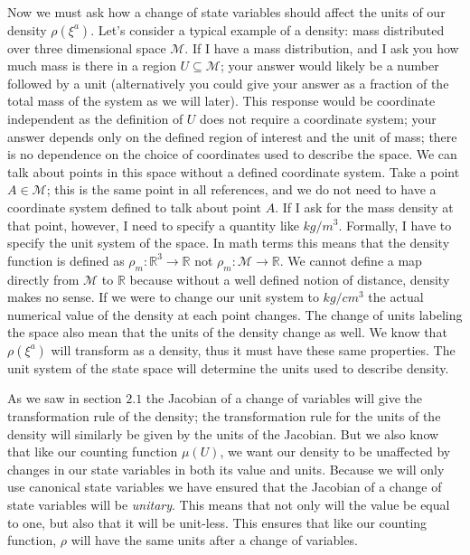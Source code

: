 \documentclass{article}
\begin{document}
	Now we must ask how a change of state variables should affect the units of our density $\rho(\xi^a)$. Let's consider a typical example of a density: mass distributed over three dimensional space $\mathcal{M}$. If I have a mass distribution, and I ask you how much mass is there in a region $U \subseteq \mathcal{M}$; your answer would likely be a number followed by a unit (alternatively you could give your answer as a fraction of the total mass of the system as we will later). This response would be coordinate independent as the definition of $U$ does not require a coordinate system; your answer depends only on the defined region of interest and the unit of mass; there is no dependence on the choice of coordinates used to describe the space. We can talk about points in this space without a defined coordinate system. Take a point $A \in \mathcal{M}$; this is the same point in all references, and we do not need to have a coordinate system defined to talk about point $A$. If I ask for the mass density at that point, however, I need to specify a quantity like $kg/m^3$. Formally, I have to specify the unit system of the space. In math terms this means that the density function is defined as $\rho_m : \mathbb{R}^3 \to \mathbb{R}$ not $\rho_m : \mathcal{M} \to \mathbb{R}$. We cannot define a map directly from $\mathcal{M}$ to $\mathbb{R}$ because without a well defined notion of distance, density makes no sense. If we were to change our unit system to $kg/cm^3$ the actual numerical value of the density at each point changes. The change of units labeling the space also mean that the units of the density change as well. We know that $\rho(\xi^a)$ will transform as a density, thus it must have these same properties. The unit system of the state space will determine the units used to describe density. 
	
	As we saw in section $2.1$ the Jacobian of a change of variables will give the transformation rule of the density; the transformation rule for the units of the density will similarly be given by the units of the Jacobian. But we also know that like our counting function $\mu(U)$, we want our density to be unaffected by changes in our state variables in both its value and units. Because we will only use canonical state variables we have ensured that the Jacobian of a change of state variables will be \textit{unitary}. This means that not only will the value be equal to one, but also that it will be unit-less. This ensures that like our counting function, $\rho$ will have the same units after a change of variables. 
	
\end{document}
